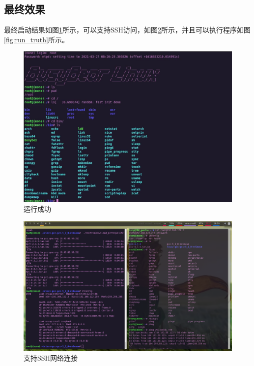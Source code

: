 % 
% 
\subsection{最终效果}
最终启动结果如图\ref{fig:success}所示，可以支持SSH访问，如图\ref{fig:ssh_transparent}所示，并且可以执行程序如图\ref{fig:run_truth}所示。
\begin{figure}[htbp]
  \centering %
  \includegraphics[width=0.9 \textwidth]{figs/Process/success.png}
  \caption{运行成功}
  \label{fig:success} %
\end{figure}

\begin{figure}[htbp]
  \centering %
  \includegraphics[width=1.0 \textwidth]{figs/Process/ssh_transparent.png}
  \caption{支持SSH网络连接}
  \label{fig:ssh_transparent} %
\end{figure}

